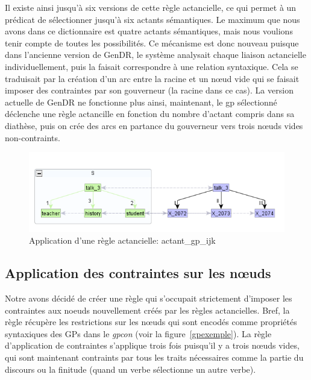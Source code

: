 Il existe ainsi jusqu'à six versions de cette règle actancielle, ce qui permet à un prédicat de sélectionner jusqu'à six actants sémantiques. Le maximum que nous avons dans ce dictionnaire est quatre actants sémantiques, mais nous voulions tenir compte de toutes les possibilités. Ce mécanisme est donc nouveau puisque dans l'ancienne version de GenDR, le système analysait chaque liaison actancielle individuellement, puis la faisait correspondre à une relation syntaxique. Cela se traduisait par la création d'un arc entre la racine et un n\oe{}ud vide qui se faisait imposer des contraintes par son gouverneur (la racine dans ce cas). La version actuelle de GenDR ne fonctionne plus ainsi, maintenant, le gp sélectionné déclenche une règle actancille en fonction du nombre d'actant compris dans sa diathèse, puis on crée des arcs en partance du gouverneur vers trois n\oe{}uds vides non-contraints.

\begin{figure}[htb]
	\centering
	\includegraphics[width=1\textwidth, trim = {0cm 0cm 0cm 0cm},clip]{ch6/figs/actant_gp_ijk.png}
	\caption{Application d'une règle actancielle: actant\_gp\_ijk}
	\label{deroulement2}
\end{figure}

\subsection{Application des contraintes sur les n\oe{}uds}
Notre avons décidé de créer une règle qui s'occupait strictement d'imposer les contraintes aux noeuds nouvellement créés par les règles actancielles. Bref, la règle récupère les restrictions sur les n\oe{}uds qui sont encodés comme propriétés syntaxiques des \acp{GP} dans le \emph{gpcon} (voir la figure~\ref{gpexemple}). La règle d'application de contraintes s'applique trois fois puisqu'il y a trois n\oe{}uds vides, qui sont maintenant contraints par tous les traits nécessaires comme la partie du discours ou la finitude (quand un verbe sélectionne un autre verbe).

